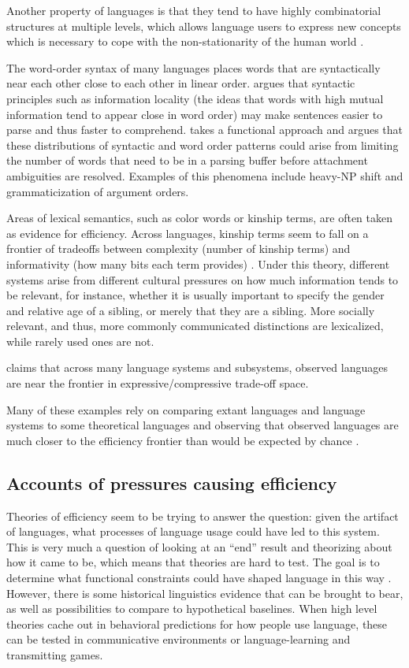 \documentclass[]{article}
\begin{document}
Another property of languages is that they tend to have highly combinatorial structures at multiple levels, which allows language users to express new concepts which is necessary to cope with the non-stationarity of the human world \cite{kirby2015}. %

The word-order syntax of many languages places words that are syntactically near each other close to each other in linear order. \cite{gibson2019} argues that syntactic principles such as information locality (the ideas that words with high mutual information tend to appear close in word order) may make sentences easier to parse and thus faster to comprehend. %
\cite{hawkins1995} takes a functional approach and argues that these distributions of syntactic and word order patterns could arise from limiting the number of words that need to be in a parsing buffer before attachment ambiguities are resolved. Examples of this phenomena include heavy-NP shift and grammaticization of argument orders. 

Areas of lexical semantics, such as color words or kinship terms, are often taken as evidence for efficiency. Across languages, kinship terms seem to fall on a frontier of tradeoffs between complexity (number of kinship terms) and informativity (how many bits each term provides) \cite{kemp2018}. Under this theory, different systems arise from different cultural pressures on how much information tends to be relevant, for instance, whether it is usually important to specify the gender and relative age of a sibling, or merely that they are a sibling. More socially relevant, and thus, more commonly communicated distinctions are lexicalized, while rarely used ones are not. 

\cite{kirby2015} claims that across many language systems and subsystems, observed languages are near the frontier in expressive/compressive trade-off space. %

Many of these examples rely on comparing extant languages and language systems to some theoretical languages and observing that observed languages are much closer to the efficiency frontier than would be expected by chance \cite{futrell2022}. 


\subsection{Accounts of pressures causing efficiency}
Theories of efficiency seem to be trying to answer the question: given the artifact of languages, what processes of language usage could have led to this system. This is very much a question of looking at an ``end'' result and theorizing about how it came to be, which means that theories are hard to test. The goal is to determine what functional constraints could have shaped language in this way \cite{futrell2022}. However, there is some historical linguistics evidence that can be brought to bear, as well as possibilities to compare to hypothetical baselines. When high level theories cache out in behavioral predictions for how people use language, these can be tested in communicative environments or language-learning and transmitting games. 
\end{document}
